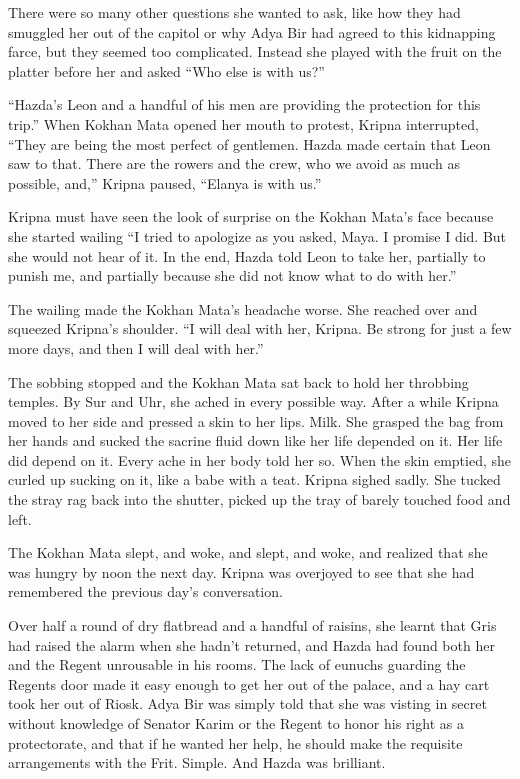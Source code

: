 \documentclass{article}
\begin{document}
	There were so many other questions she wanted to ask, like how they had smuggled her out of the capitol or why Adya Bir had agreed to this kidnapping farce, but they seemed too complicated. Instead she played with the fruit on the platter before her and asked “Who else is with us?”
	
	“Hazda’s Leon and a handful of his men are providing the protection for this trip.” When Kokhan Mata opened her mouth to protest, Kripna interrupted, “They are being the most perfect of gentlemen. Hazda made certain that Leon saw to that. There are the rowers and the crew, who we avoid as much as possible, and,” Kripna paused, “Elanya is with us.” 
	
	Kripna must have seen the look of surprise on the Kokhan Mata’s face because she started wailing “I tried to apologize as you asked, Maya. I promise I did. But she would not hear of it. In the end, Hazda told Leon to take her, partially to punish me, and partially because she did not know what to do with her.”
	
	The wailing made the Kokhan Mata’s headache worse. She reached over and squeezed Kripna’s shoulder. “I will deal with her, Kripna. Be strong for just a few more days, and then I will deal with her.” 
	
	The sobbing stopped and the Kokhan Mata sat back to hold her throbbing temples. By Sur and Uhr, she ached in every possible way. After a while Kripna moved to her side and pressed a skin to her lips. Milk. She grasped the bag from her hands and sucked the sacrine fluid down like her life depended on it. Her life did depend on it. Every ache in her body told her so. When the skin emptied, she curled up sucking on it, like a babe with a teat. Kripna sighed sadly. She tucked the stray rag back into the shutter, picked up the tray of barely touched food and left.
	
	The Kokhan Mata slept, and woke, and slept, and woke, and realized that she was hungry by noon the next day. Kripna was overjoyed to see that she had remembered the previous day’s conversation.
	
	Over half a round of dry flatbread and a handful of raisins, she learnt that Gris had raised the alarm when she hadn’t returned, and Hazda had found both her and the Regent unrousable in his rooms. The lack of eunuchs guarding the Regents door made it easy enough to get her out of the palace, and a hay cart took her out of Riosk. Adya Bir was simply told that she was visting in secret without knowledge of Senator Karim or the Regent to honor his right as a protectorate, and that if he wanted her help, he should make the requisite arrangements with the Frit. Simple. And Hazda was brilliant.
	
\end{document}
